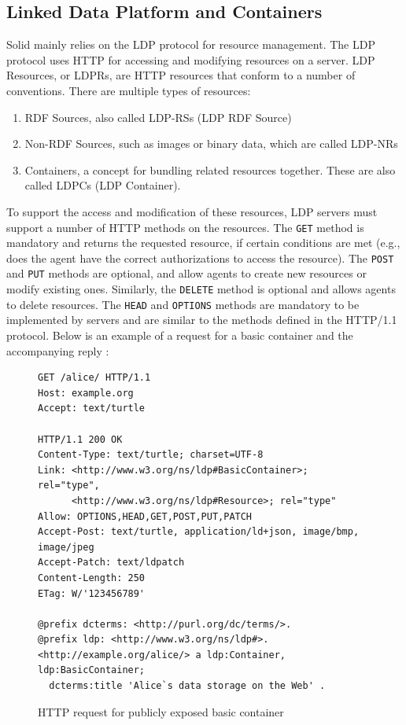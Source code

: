 \subsection{Linked Data Platform and Containers}
\label{subsec:ldp}
Solid mainly relies on the \gls{LDP} protocol \citep{ldp} for resource management. The \gls{LDP} protocol uses HTTP for accessing and modifying resources on a server. LDP Resources, or LDPRs, are HTTP resources that conform to a number of conventions. There are multiple types of resources:
\begin{enumerate}
    \item \gls{RDF} Sources, also called LDP-RSs (\gls{LDP} \gls{RDF} Source)
    \item Non-\gls{RDF} Sources, such as images or binary data, which are called LDP-NRs
    \item Containers, a concept for bundling related resources together. These are also called LDPCs (\gls{LDP} Container). 
\end{enumerate}

\noindent To support the access and modification of these resources, \gls{LDP} servers must support a number of HTTP methods on the resources. The \texttt{GET} method is mandatory and returns the requested resource, if certain conditions are met (e.g., does the agent have the correct authorizations to access the resource). The \texttt{POST} and \texttt{PUT} methods are optional, and allow agents to create new resources or modify existing ones. Similarly, the \texttt{DELETE} method is optional and allows agents to delete resources. The \texttt{HEAD} and \texttt{OPTIONS} methods are mandatory to be implemented by servers and are similar to the methods defined in the HTTP/1.1 protocol. Below is an example of a request for a basic container and the accompanying reply \citep[from][]{ldp-primer}:
\begin{figure}[H]
    \begin{verbatim}
GET /alice/ HTTP/1.1
Host: example.org
Accept: text/turtle

HTTP/1.1 200 OK 
Content-Type: text/turtle; charset=UTF-8
Link: <http://www.w3.org/ns/ldp#BasicContainer>; rel="type", 
      <http://www.w3.org/ns/ldp#Resource>; rel="type"
Allow: OPTIONS,HEAD,GET,POST,PUT,PATCH
Accept-Post: text/turtle, application/ld+json, image/bmp, image/jpeg
Accept-Patch: text/ldpatch
Content-Length: 250
ETag: W/'123456789'
	
@prefix dcterms: <http://purl.org/dc/terms/>.
@prefix ldp: <http://www.w3.org/ns/ldp#>.
<http://example.org/alice/> a ldp:Container, ldp:BasicContainer;
  dcterms:title 'Alice`s data storage on the Web' .	
\end{verbatim}
    \caption{HTTP request for publicly exposed basic container}
    \label{fig:ldpc-request}
\end{figure}


